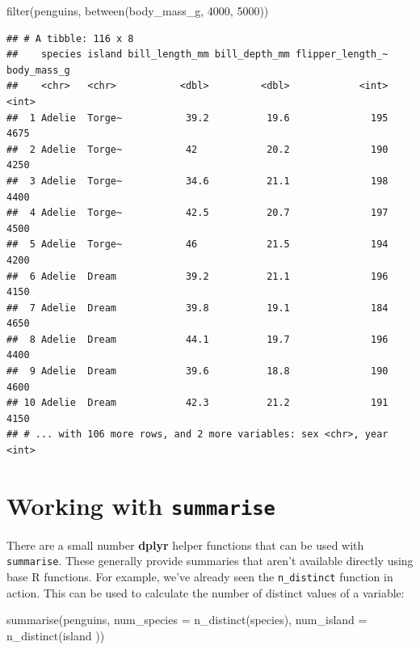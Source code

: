 \documentclass[
]{book}
\newenvironment{Shaded}{\begin{snugshade}}{\end{snugshade}}
\newcommand{\AttributeTok}[1]{\textcolor[rgb]{0.77,0.63,0.00}{#1}}
\newcommand{\DecValTok}[1]{\textcolor[rgb]{0.00,0.00,0.81}{#1}}
\newcommand{\FunctionTok}[1]{\textcolor[rgb]{0.00,0.00,0.00}{#1}}
\newcommand{\NormalTok}[1]{#1}
\begin{document}
\begin{Shaded}
\begin{Highlighting}[]
\FunctionTok{filter}\NormalTok{(penguins, }\FunctionTok{between}\NormalTok{(body\_mass\_g, }\DecValTok{4000}\NormalTok{, }\DecValTok{5000}\NormalTok{))}
\end{Highlighting}
\end{Shaded}

\begin{verbatim}
## # A tibble: 116 x 8
##    species island bill_length_mm bill_depth_mm flipper_length_~ body_mass_g
##    <chr>   <chr>           <dbl>         <dbl>            <int>       <int>
##  1 Adelie  Torge~           39.2          19.6              195        4675
##  2 Adelie  Torge~           42            20.2              190        4250
##  3 Adelie  Torge~           34.6          21.1              198        4400
##  4 Adelie  Torge~           42.5          20.7              197        4500
##  5 Adelie  Torge~           46            21.5              194        4200
##  6 Adelie  Dream            39.2          21.1              196        4150
##  7 Adelie  Dream            39.8          19.1              184        4650
##  8 Adelie  Dream            44.1          19.7              196        4400
##  9 Adelie  Dream            39.6          18.8              190        4600
## 10 Adelie  Dream            42.3          21.2              191        4150
## # ... with 106 more rows, and 2 more variables: sex <chr>, year <int>
\end{verbatim}

\hypertarget{working-with-summarise}{%
\section{\texorpdfstring{Working with \texttt{summarise}}{Working with summarise}}\label{working-with-summarise}}

There are a small number \textbf{dplyr} helper functions that can be used with \texttt{summarise}. These generally provide summaries that aren't available directly using base R functions. For example, we've already seen the \texttt{n\_distinct} function in action. This can be used to calculate the number of distinct values of a variable:

\begin{Shaded}
\begin{Highlighting}[]
\FunctionTok{summarise}\NormalTok{(penguins, }
          \AttributeTok{num\_species =} \FunctionTok{n\_distinct}\NormalTok{(species),}
          \AttributeTok{num\_island  =} \FunctionTok{n\_distinct}\NormalTok{(island ))}
\end{Highlighting}
\end{Shaded}
\end{document}
